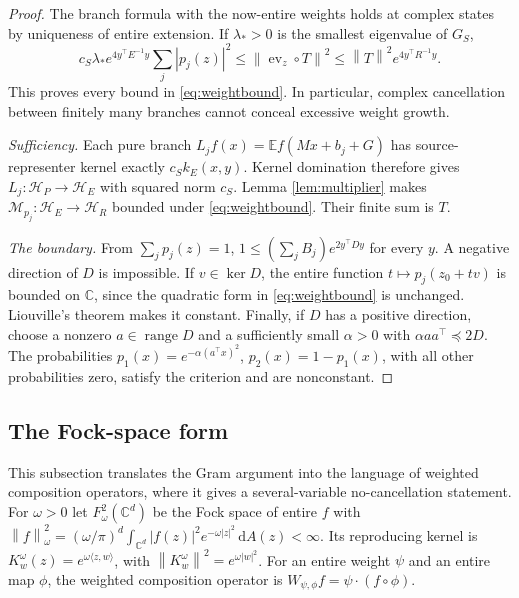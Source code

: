 \documentclass[11pt,a4paper]{article}
\theoremstyle{remark}
\newcommand{\C}{\mathbb C}
\newcommand{\E}{\mathbb E}
\newcommand{\HH}{\mathcal H}
\newcommand{\dd}{\,\mathrm d}
\newcommand{\norm}[1]{\left\lVert#1\right\rVert}
\newcommand{\Mult}{\mathcal M}
\begin{document}
\begin{proof}
The branch formula with the now-entire weights holds at
complex states by uniqueness of entire extension. If
$\lambda_*>0$ is the smallest eigenvalue of $G_S$,
\begin{equation}\label{eq:weightnecessity}
 c_S\lambda_*e^{4y^\top E^{-1}y}
                  \sum_j|p_j(z)|^2
 \le \norm{\operatorname{ev}_z\circ T}^2
 \le \norm{T}^2e^{4y^\top R^{-1}y}.
\end{equation}
This proves every bound in \eqref{eq:weightbound}.
In particular, complex cancellation between finitely many
branches cannot conceal excessive weight growth.

\emph{Sufficiency.}
Each pure branch $L_jf(x)=\E f(Mx+b_j+G)$ has source-representer
kernel exactly $c_Sk_E(x,y)$. Kernel domination therefore
gives $L_j:\HH_P\to\HH_E$ with squared norm $c_S$.
Lemma \ref{lem:multiplier} makes
$\Mult_{p_j}:\HH_E\to\HH_R$ bounded under
\eqref{eq:weightbound}. Their finite sum is $T$.

\emph{The boundary.}
From $\sum_jp_j(z)=1$,
$1\le(\sum_jB_j)e^{2y^\top Dy}$ for every $y$.
A negative direction of $D$ is impossible.
If $v\in\ker D$, the entire function
$t\mapsto p_j(z_0+tv)$ is bounded on $\C$, since the quadratic
form in \eqref{eq:weightbound} is unchanged. Liouville's theorem
makes it constant. Finally, if $D$ has a positive direction,
choose a nonzero $a\in\operatorname{range}D$ and a sufficiently
small $\alpha>0$ with $\alpha aa^\top\preceq2D$.
The probabilities $p_1(x)=e^{-\alpha(a^\top x)^2}$,
$p_2(x)=1-p_1(x)$, with all other probabilities zero, satisfy
the criterion and are nonconstant.
\end{proof}

\subsection{The Fock-space form}

This subsection translates the Gram argument into the language of
weighted composition operators, where it gives a several-variable
no-cancellation statement. For $\omega>0$ let $F^2_\omega(\C^d)$ be the
Fock space of entire $f$ with
$\norm{f}_\omega^2=(\omega/\pi)^d\int_{\C^d}|f(z)|^2e^{-\omega|z|^2}\dd
A(z)<\infty$. Its reproducing kernel is $K^\omega_w(z)=e^{\omega\langle
z,w\rangle}$, with $\norm{K^\omega_w}^2=e^{\omega|w|^2}$. For an entire
weight $\psi$ and an entire map $\phi$, the weighted composition
operator is $W_{\psi,\phi}f=\psi\cdot(f\circ\phi)$.
\end{document}
